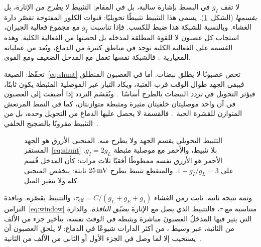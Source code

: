 لا تقف $g_I$ في البسط بإشارة سالبة، بل في المقام: التثبيط لا \emph{يطرح} من الإثارة، بل \emph{يقسمها} (الشكل~\ref{fig:shunt}). يسمى هذا التثبيط تثبيطًا تحويليًا: قنوات الكلور المفتوحة تقصّر دارة الغشاء. وبالنسبة للشبكة هذا ضبط للكسب. فإذا تناسبت $g_I$ مع مجموع فعالية الجيران، استجاب كل عصبون لا للقوة المطلقة لمدخله بل لحصتها من الفعالية الكلية. وهذه القسمة على الفعالية الكلية توجد في مناطق كثيرة من الدماغ، وتُعد من عملياته المعيارية~\cite{Carandini2012}: فالشبكة نفسها تعمل مع المدخل الضعيف ومع القوي.

تحفّظ: الصيغة~\eqref{eq:shunt} تخص عصبونًا لا يطلق نبضات. أما في العصبون المنطلق فيبقى الجهد طوال الوقت قرب العتبة، ويكاد التيار عبر الموصلية المثبطة يكون ثابتًا، فيؤثر التحويل في \emph{تردد} النبضات بالطرح أساسًا~\cite{HoltKoch1997}. ويُقسَم التردد إذا أضيفت إلى العصبون في آن واحد موصليتان خلفيتان مثيرة ومثبطة متوازنتان، كما في النمط المرتعش المتوازن للقشرة الحية~\cite{Chance2002}. فالقسمة لا يحصل عليها الدماغ من التحويل وحده، بل من التثبيط مقرونًا بالضجيج الخلفي~\cite{Carandini2012}.

\begin{figure}[t]
\centering
{}
\caption{التثبيط التحويلي يقسم الجهد ولا يطرح منه. المنحنى الأزرق هو الجهد المستقر~\eqref{eq:shunt} بلا تثبيط، والأحمر مع موصلية مثبطة $g_I=2g_L$. الأحمر هو الأزرق نفسه ممطوطًا أفقيًا ثلاث مرات: كأن المدخل قُسم على $1+g_I/g_L=3$. والمتقطع تثبيط يطرح $25\,\text{mV}$ ثابتة: ينخفض المنحنى كله ولا يتغير الميل.}
\label{fig:shunt}
\end{figure}

وثمة نتيجة ثانية. ثابت زمن الغشاء $\tau_{\text{eff}}=C/(g_L+g_E+g_I)$، والتثبيط يقصّره. ونافذة التزامن~\eqref{eq:window} متناسبة مع $\tau$، فالتثبيط الذي يصل مع الإثارة \emph{يضيّق النافذة}. والدارة التي يثير فيها المدخلُ العصبونَ مباشرة ويثبطه في الوقت نفسه، بتأخير جزء من الألف من الثانية، عبر وسيط ، من أكثر الدارات شيوعًا في الدماغ: لا يلحق العصبون أن يستجيب إلا لما وصل في الجزء الأول أو الثاني من الألف من الثانية~\cite{Pouille2001}.

